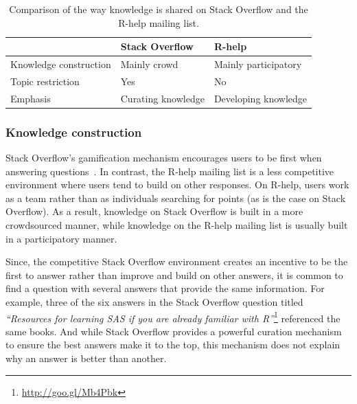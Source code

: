 \documentclass[smallextended]{svjour3}       %
\newcommand{\SO}{Stack Overflow\xspace}
\newcommand{\RH}{R-help\xspace}
\begin{document}
    \begin{table}[!htb]
      \centering
      \caption{Comparison of the way knowledge is shared on \SO and the \RH mailing list.}
      \label{table:constrat}
      \begin{small}
        \setlength{\tabcolsep}{5pt}
        \begin{tabular}{@{}lll@{}}
          \toprule
          \textbf{}      & \textbf{\SO} & \textbf{\RH}\\
          \midrule
          Knowledge construction & Mainly crowd             & Mainly participatory \\
          Topic restriction      & Yes & No \\
          Emphasis & Curating knowledge & Developing knowledge \\ 
          \bottomrule
        \end{tabular}
      \end{small}
\vspace{-4mm}
    \end{table}

\subsubsection{Knowledge construction}

\SO's gamification mechanism encourages users to be first when answering questions~\cite{Singer2013}. In contrast, the \RH mailing list is a less competitive
environment where users tend to build on other responses. On \RH, users work as a team rather than as individuals searching for points (as is the case on \SO).
As a result, knowledge on \SO is built in a more crowdsourced manner, while knowledge on the \RH mailing list is usually built in a participatory manner.

Since, the competitive \SO environment creates an incentive to be the first to answer rather than improve and build on other answers, it is common to find a question with several answers that provide the same information. For example, three of the six answers in the \SO question titled \textit{``Resources for learning SAS if you are already familiar with R''}\footnote{\url{http://goo.gl/Mb4Pbk}} referenced the same books.
And while \SO provides a powerful curation mechanism to ensure the best answers make it to the top, this mechanism does not explain why an answer is better than another.
\end{document}
